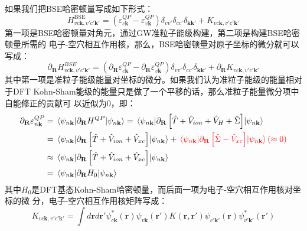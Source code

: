 {  如果我们把BSE哈密顿量写成如下形式：
  \begin{equation}
    H_{vc\mathbf{k},v'c'\mathbf{k}'}^{\mathrm{BSE}}
    =
    (\varepsilon_{c\mathbf{k}}^{QP} - \varepsilon_{v\mathbf{k}}^{QP})
    \delta_{vv'}\delta_{cc'}\delta_{\mathbf{kk'}}
    +
    K_{vc\mathbf{k},v'c'\mathbf{k}'}
  \end{equation}
  第一项是BSE哈密顿量对角元，通过GW准粒子能级构建，第二项是构建BSE哈密顿量所需的
  电子-空穴相互作用核，那么，BSE哈密顿量对原子坐标的微分就可以写成：
  \begin{equation}
    \partial_\mathbf{R}
    H_{vc\mathbf{k},v'c'\mathbf{k}'}^{BSE}
    =
    (\partial_\mathbf{R}\varepsilon_{c\mathbf{k}}^{QP} - \partial_\mathbf{R}\varepsilon_{v\mathbf{k}}^{QP})
    \delta_{vv'}\delta_{cc'}\delta_{\mathbf{kk'}}
    +
    \partial_\mathbf{R}K_{vc\mathbf{k},v'c'\mathbf{k}'}
  \end{equation}
  其中第一项是准粒子能级能量对坐标的微分。如果我们认为准粒子能级的能量相对于DFT
  Kohn-Sham能级的能量只是做了一个平移的话，那么准粒子能量微分项中自能修正的贡献可
  以近似为0，即：
  \begin{align}
    \partial_\mathbf{R}\varepsilon_{n\mathbf{k}}^{QP}
    &= \mel{\psi_{n\mathbf{k}}}{\partial_\mathbf{R} H^{QP}}{\psi_{n\mathbf{k}}}
      = \mel{\psi_{n\mathbf{k}}}{
      \partial_\mathbf{R}
      \left[\hat{T} + \hat{V}_{ion} +
      \hat{V}_H + \hat{\Sigma}\right]}{\psi_{n\mathbf{k}}}
      \nonumber \\
    &= \mel{\psi_{n\mathbf{k}}}{
      \partial_\mathbf{R}
      \left[\hat{T} + \hat{V}_{ion} +
      \hat{V}_{xc}\right]}{\psi_{n\mathbf{k}}}
      +
      {\color{red}
      \mel{\psi_{n\mathbf{k}}}{
      \partial_\mathbf{R}
      \left[\hat{\Sigma} - \hat{V}_{xc}\right]}{\psi_{n\mathbf{k}}}
      (\approx 0)
      }
      \nonumber \\
    &\approx \mel{\psi_{n\mathbf{k}}}{
      \partial_\mathbf{R}
      \left[\hat{T} + \hat{V}_{ion} +
      \hat{V}_{xc}\right]}{\psi_{n\mathbf{k}}}
      \nonumber \\
    &= \mel{\psi_{n\mathbf{k}}}{
      \partial_\mathbf{R} H_0
      }{\psi_{n\mathbf{k}}}
  \end{align}
  其中$H_0$是DFT基态Kohn-Sham哈密顿量，而后面一项为电子-空穴相互作用核对坐标的微
  分，电子-空穴相互作用核矩阵写成：
  \begin{equation}
  K_{vc\mathbf{k},v'c'\mathbf{k'}}=\int{d\mathbf{r}d\mathbf{r'}\psi_{c\mathbf{k}}^{*}(\mathbf{r})\psi_{v\mathbf{k}}(\mathbf{r'})K(\mathbf{r},\mathbf{r'})\psi_{c'\mathbf{k'}}(\mathbf{r})\psi_{v'\mathbf{k'}}^{*}(\mathbf{r'})}

\end{equation}}
